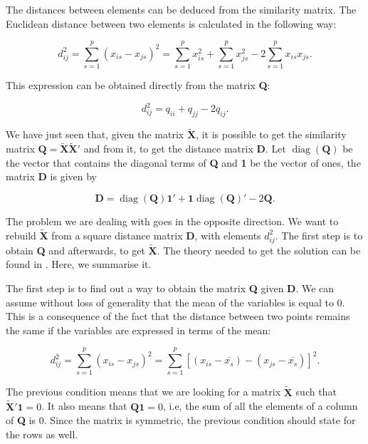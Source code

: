 \documentclass[11pt]{report}
\DeclareMathOperator{\diag}{diag}
\begin{document}
\indent The distances between elements can be deduced from the similarity 
matrix. The Euclidean distance between two elements is calculated in the 
following way:

\begin{equation} \label{dij}
d^2_{ij} =  \sum_{s=1}^{p} (x_{is}- x_{js} )^2  = \sum_{s=1}^{p}x_{is}^2 + \sum_{s=1}^p x_{js}^2 - 2\sum_{s=1}^{p} x_{is}x_{js}.
\end{equation}

\indent This expression can be obtained directly from the matrix \textbf{Q}:

\begin{equation} \label{dfromq}
d^2_{ij} = q_{ii} + q_{jj} - 2q_{ij}.
\end{equation}

\indent We have just seen that, given the matrix $\mathbf{\widetilde{X}}$, 
it is possible to get the similarity matrix 
$\mathbf{Q} = \mathbf{\widetilde{X}}\mathbf{\widetilde{X}'}$ and from it, 
to get the distance matrix \textbf{D}. Let $\diag(\mathbf{Q})$ be the
vector that contains the diagonal terms of \textbf{Q} and \textbf{1} be the vector
of ones, the matrix \textbf{D} is given by

\[
\mathbf{D} = \diag(\mathbf{Q}) \mathbf{1}' + \mathbf{1}\diag(\mathbf{Q})' - 2\mathbf{Q}.
\]

\indent The problem we are dealing with goes in the opposite direction. We want 
to rebuild $\mathbf{\widetilde{X}}$ from a square distance matrix \textbf{D}, 
with elements $d_{ij}^2$. The first step is to obtain \textbf{Q} and afterwards, 
to get $\mathbf{\widetilde{X}}$. The theory needed to get the solution can be 
found in \cite{pena_libro}. Here, we summarise it.

\indent The first step is to find out a way to obtain the matrix \textbf{Q} 
given \textbf{D}. We can assume without loss of generality that the mean of 
the variables is equal to 0. This is a consequence of the fact that the distance 
between two points remains the same if the variables are expressed in terms 
of the mean:


\begin{equation} \label{dtraslated}
d_{ij}^2 = \sum_{s = 1}^p (x_{is} - x_{js})^2 = \sum_{s=1} ^p [(x_{is} - \overline{x_s})- (x_{js} - \overline{x_s})]^2.
\end{equation}

\indent The previous condition means that we are looking for a matrix  
$\mathbf{\widetilde{X}}$ such that $\mathbf{\widetilde{X}'}\mathbf{1} = 0$. 
It also means that $\mathbf{Q}\mathbf{1} = 0$, i.e, the sum of all the elements 
of a column of \textbf{Q} is 0. Since the matrix is symmetric, the previous 
condition should state for the rows as well. 
\end{document}
